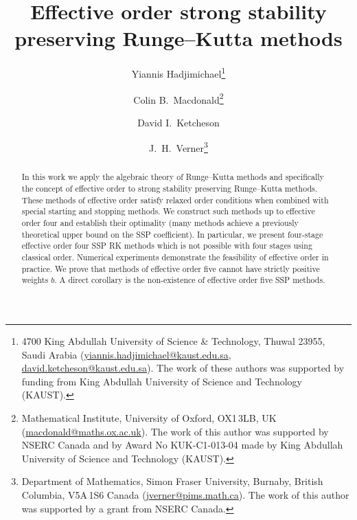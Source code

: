 \documentclass[10pt,a4paper,oneside]{article}
\title{Effective order strong stability preserving Runge--Kutta methods}
\author{%
  Yiannis Hadjimichael\footnote{ 4700 King Abdullah University of
    Science \& Technology, Thuwal 23955, Saudi Arabia
    (\url{yiannis.hadjimichael@kaust.edu.sa},
    \url{david.ketcheson@kaust.edu.sa}).  The work of these authors
    was supported by funding from King Abdullah University of Science
    and Technology (KAUST).  } \and
  Colin B.~Macdonald\thanks{Mathematical Institute, University of
    Oxford, OX1\,3LB, UK (\url{macdonald@maths.ox.ac.uk}).  The work
    of this author was supported by NSERC Canada and by Award No
    KUK-C1-013-04 made by King Abdullah University of Science and
    Technology (KAUST).} \and
  David I.~Ketcheson\footnotemark[1] \and
  J.~H.~Verner\thanks{Department of Mathematics, Simon Fraser
    University, Burnaby, British Columbia, V5A\,1S6 Canada
    (\url{jverner@pims.math.ca}).  The work of this author was
    supported by a grant from NSERC Canada.}  }
\numberwithin{theorem}{section}
\numberwithin{table}{section}
\numberwithin{figure}{section}
\numberwithin{equation}{section}
\begin{document}
\maketitle


\begin{abstract}
  In this work we apply the algebraic theory of Runge--Kutta methods
  and specifically the concept of effective order to strong stability
  preserving Runge--Kutta methods.  These methods of effective order
  satisfy relaxed order conditions when combined with special starting
  and stopping methods.  We construct such methods up to effective
  order four and establish their optimality (many methods achieve a
  previously theoretical upper bound on the SSP coefficient).  In
  particular, we present four-stage effective order four SSP RK
  methods which is not possible with four stages using classical
  order.  Numerical experiments demonstrate the feasibility of
  effective order in practice.  We prove that methods of effective
  order five cannot have strictly positive weights $b$.  A direct
  corollary is the non-existence of effective order five SSP methods.
\end{abstract}













%


\end{document}
